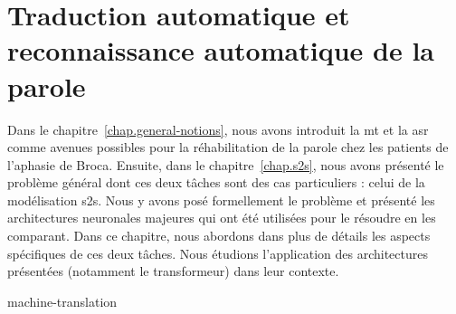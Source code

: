 \chapter{Traduction automatique et reconnaissance automatique de la parole}
\label{chap.mt-and-asr}

Dans le chapitre~\ref{chap.general-notions}, 
nous avons introduit la \gls{mt} et la \gls{asr} comme avenues possibles 
pour la réhabilitation de la parole chez les patients de l'aphasie de Broca.
Ensuite, dans le chapitre~\ref{chap.s2s}, nous avons présenté le problème général
dont ces deux tâches sont des cas particuliers : celui de la modélisation \gls{s2s}.
Nous y avons posé formellement le problème 
et présenté les architectures neuronales majeures qui ont été utilisées pour le résoudre en les comparant.
Dans ce chapitre, nous abordons dans plus de détails les aspects spécifiques de ces deux tâches.
Nous étudions l'application des architectures présentées (notamment le transformeur) dans leur contexte.

{machine-translation}